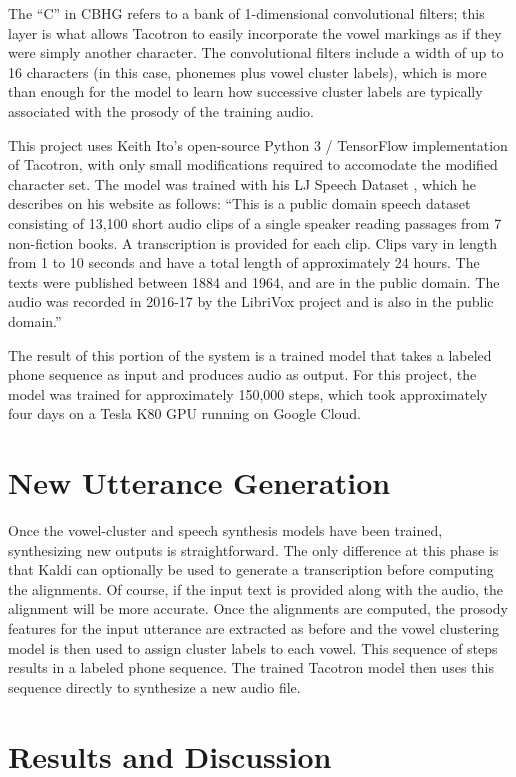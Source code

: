 \documentclass{article}
\begin{document}
The ``C'' in CBHG refers to a bank of 1-dimensional convolutional filters; this layer is what allows Tacotron to easily incorporate the vowel markings as if they were simply another character. The convolutional filters include a width of up to 16 characters (in this case, phonemes plus vowel cluster labels), which is more than enough for the model to learn how successive cluster labels are typically associated with the prosody of the training audio.

This project uses Keith Ito's open-source Python 3 / TensorFlow implementation of Tacotron, with only small modifications required to accomodate the modified character set. The model was trained with his LJ Speech Dataset \cite{ljspeech17}, which he describes on his website as follows:
``This is a public domain speech dataset consisting of 13,100 short audio clips of a single speaker reading passages from 7 non-fiction books. A transcription is provided for each clip. Clips vary in length from 1 to 10 seconds and have a total length of approximately 24 hours. The texts were published between 1884 and 1964, and are in the public domain. The audio was recorded in 2016-17 by the LibriVox project and is also in the public domain.''

The result of this portion of the system is a trained model that takes a labeled phone sequence as input and produces audio as output. For this project, the model was trained for approximately 150,000 steps, which took approximately four days on a Tesla K80 GPU running on Google Cloud.

\section{New Utterance Generation}
\label{sec:newuttgen}
Once the vowel-cluster and speech synthesis models have been trained, synthesizing new outputs is straightforward.
The only difference at this phase is that Kaldi can optionally be used to generate a transcription before computing the alignments.
Of course, if the input text is provided along with the audio, the alignment will be more accurate.
Once the alignments are computed, the prosody features for the input utterance are extracted as before and the vowel clustering model is then used to assign cluster labels to each vowel.
This sequence of steps results in a labeled phone sequence.
The trained Tacotron model then uses this sequence directly to synthesize a new audio file.

\section{Results and Discussion}
\label{sec:results}
\end{document}

